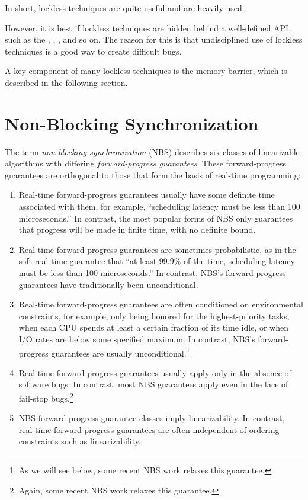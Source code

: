 In short, lockless techniques are quite useful and are heavily used.

However, it is best if lockless techniques are hidden behind a
well-defined API, such as the , ,
, and so on.
The reason for this is that undisciplined use of lockless techniques
is a good way to create difficult bugs.

A key component of many lockless techniques is the memory barrier,
which is described in the following section.



\section{Non-Blocking Synchronization}
\label{sec:advsync:Non-Blocking Synchronization}

The term \emph{non-blocking synchronization} (NBS) describes six classes of
linearizable algorithms with differing \emph{forward-progress guarantees}.
These forward-progress guarantees are orthogonal to those that form the
basis of real-time programming:

\begin{enumerate}
\item	Real-time forward-progress guarantees usually have some
	definite time associated with them, for example,
	``scheduling latency must be less than 100 microseconds.''
	In contrast, the most popular forms of NBS only guarantees
	that progress will be made in finite time, with no definite
	bound.
\item	Real-time forward-progress guarantees are sometimes
	probabilistic, as in the soft-real-time guarantee that
	``at least 99.9\% of the time, scheduling latency must
	be less than 100 microseconds.''
	In contrast, NBS's forward-progress
	guarantees have traditionally been unconditional.
\item	Real-time forward-progress guarantees are often conditioned on
	environmental constraints, for example, only being honored
	for the highest-priority tasks, when each CPU spends at least
	a certain fraction of its time idle, or when I/O rates are
	below some specified maximum.
	In contrast, NBS's forward-progress
	guarantees are usually unconditional.\footnote{
		As we will see below, some recent NBS work relaxes
		this guarantee.}
\item	Real-time forward-progress guarantees usually apply only
	in the absence of software bugs.
	In contrast, most NBS guarantees apply even in the face of
	fail-stop bugs.\footnote{
		Again, some recent NBS work relaxes this guarantee.}
\item	NBS forward-progress guarantee classes imply linearizability.
	In contrast, real-time forward progress guarantees are often
	independent of ordering constraints such as linearizability.
\end{enumerate}

